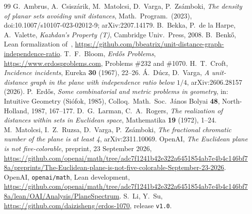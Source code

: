 \documentclass[11pt]{amsart}
\theoremstyle{definition}
\theoremstyle{remark}
\begin{document}
\begin{thebibliography}{99}
 G.~Ambrus, A.~Csisz\'arik, M.~Matolcsi, D.~Varga, P.~Zs\'amboki, \emph{The density of planar sets avoiding unit distances}, Math.\ Program.\ (2023), doi:10.1007/s10107-023-02012-9; arXiv:2207.14179.
 B.~Bekka, P.~de la Harpe, A.~Valette, \emph{Kazhdan's Property (T)}, Cambridge Univ.\ Press, 2008.
 B.~Benk\H{o}, Lean formalization of~\cite{DV}, \url{https://github.com/bbeatrix/unit-distance-graph-independence-ratio}.
 T.~F.~Bloom, \emph{Erd\H{o}s Problems}, \url{https://www.erdosproblems.com}, Problems \#232 and \#1070.
 H.~T.~Croft, \emph{Incidence incidents}, Eureka \textbf{30} (1967), 22--26.
 \'A.~D\'ucz, D.~Varga, \emph{A unit-distance graph in the plane with independence ratio below $1/4$}, arXiv:2606.28157 (2026).
 P.~Erd\H{o}s, \emph{Some combinatorial and metric problems in geometry}, in: Intuitive Geometry (Si\'ofok, 1985), Colloq.\ Math.\ Soc.\ J\'anos Bolyai \textbf{48}, North-Holland, 1987, 167--177.
 D.~G.~Larman, C.~A.~Rogers, \emph{The realization of distances within sets in Euclidean space}, Mathematika \textbf{19} (1972), 1--24.
 M.~Matolcsi, I.~Z.~Ruzsa, D.~Varga, P.~Zs\'amboki, \emph{The fractional chromatic number of the plane is at least 4}, arXiv:2311.10069.
 OpenAI, \emph{The Euclidean plane is not five-colorable}, preprint, 23 September 2026, \url{https://github.com/openai/math/tree/adc7f1241b42e322a6451854ab7e4b4c146bf78a/preprints/The-Euclidean-plane-is-not-five-colorable-September-23-2026}.
 OpenAI, \texttt{openai/math}, Lean development, \url{https://github.com/openai/math/tree/adc7f1241b42e322a6451854ab7e4b4c146bf78a/lean/OAI/Analysis/PlaneSpectrum}.
 S.~Li, Y.~Su, \url{https://github.com/daizisheng/erdos-1070}, release \texttt{v1.0}.
\end{thebibliography}
\end{document}

